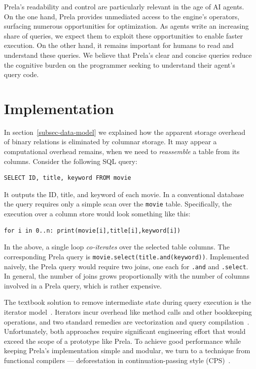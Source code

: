 \documentclass[sigconf,screen,pbalance]{cidr-2027}
\newcommand{\code}{\lstinline[style=prela]}
\begin{document}
Prela's readability and control are particularly relevant in the age of AI agents.
On the one hand, Prela provides unmediated access to the engine's operators, surfacing numerous opportunities for optimization.
As agents write an increasing share of queries, we expect them to exploit these opportunities to enable faster execution.
On the other hand, it remains important for humans to read and understand these queries.
We believe that Prela's clear and concise queries reduce the cognitive burden on the programmer seeking to understand their agent's query code.

\section{Implementation}\label{sec-implementation}

In section~\ref{subsec-data-model} we explained how the apparent storage overhead of binary relations is eliminated by columnar storage.
It may appear a computational overhead remains, when we need to \emph{reassemble} a table from its columns.
Consider the following SQL query:

\begin{lstlisting}[style=sql]
SELECT ID, title, keyword FROM movie
\end{lstlisting}

It outputs the ID, title, and keyword of each movie.
In a conventional database the query requires only a simple scan over the \code|movie| table.
Specifically, the execution over a column store would look something like this:

\begin{lstlisting}
for i in 0..n: print(movie[i],title[i],keyword[i])
\end{lstlisting}

In the above, a single loop \emph{co-iterates} over the selected table columns.
The corresponding Prela query is \lstinline[style=prela,breaklines]|movie.select(title.and(keyword))|.
Implemented naively, the Prela query would require two joins, one each for \code|.and| and \code|.select|.
In general, the number of joins grows proportionally with the number of columns involved in a Prela query, which is rather expensive.

The textbook solution to remove intermediate state during query execution is the iterator model~\cite{DBLP:journals/tkde/Graefe94}.
Iterators incur overhead like method calls and other bookkeeping operations, and two standard remedies are vectorization and query compilation~\cite{DBLP:journals/pvldb/KerstenLKNPB18}.
Unfortunately, both approaches require significant engineering effort that would exceed the scope of a prototype like Prela.
To achieve good performance while keeping Prela's implementation simple and modular, we turn to a technique from functional compilers --- deforestation in continuation-passing style (CPS)~\cite{DBLP:conf/fpca/GillLJ93}.
\end{document}
